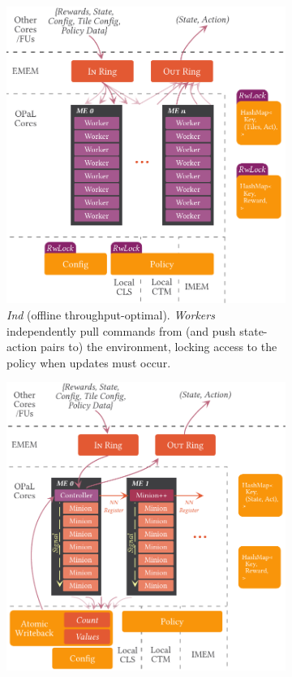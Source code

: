 \documentclass[
sigconf,natbib=false
]{acmart}
\newcommand{\Indfw}{\emph{Ind}}
\begin{document}
\begin{figure}
	\centering
	\begin{subfigure}{0.45\linewidth}
		\centering
		\includegraphics[keepaspectratio, width=0.9\linewidth]{figures/ind}
		\caption{\Indfw{} (offline throughput-optimal). \emph{Workers} independently pull commands from (and push state-action pairs to) the environment, locking access to the policy when updates must occur.\label{fig:single-and-parallel:single}}
	\end{subfigure}
	\hspace{0.04\linewidth}
	\begin{subfigure}{0.45\linewidth}
		\centering
		\includegraphics[keepaspectratio, width=0.9\linewidth]{figures/coop}

\end{subfigure}
\end{figure}
\end{document}
